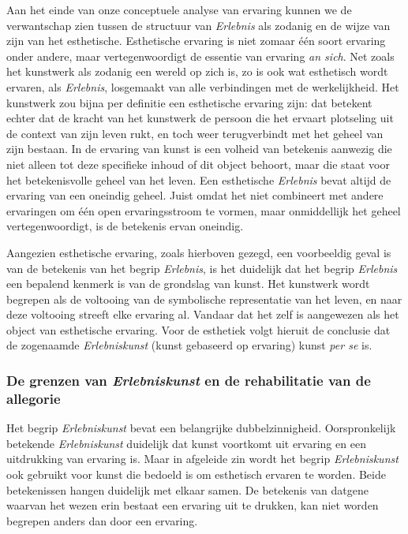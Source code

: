 Aan het einde van onze conceptuele analyse van ervaring kunnen we de verwantschap zien tussen de structuur van \textit{Erlebnis} als zodanig en de wijze van zijn van het esthetische. Esthetische ervaring is niet zomaar één soort ervaring onder andere, maar vertegenwoordigt de essentie van ervaring \textit{an sich}. Net zoals het kunstwerk als zodanig een wereld op zich is, zo is ook wat esthetisch wordt ervaren, als \textit{Erlebnis}, losgemaakt van alle verbindingen met de werkelijkheid. Het kunstwerk zou bijna per definitie een esthetische ervaring zijn: dat betekent echter dat de kracht van het kunstwerk de persoon die het ervaart plotseling uit de context van zijn leven rukt, en toch weer terugverbindt met het geheel van zijn bestaan. In de ervaring van kunst is een volheid van betekenis aanwezig die niet alleen tot deze specifieke inhoud of dit object behoort, maar die staat voor het betekenisvolle geheel van het leven. Een esthetische \textit{Erlebnis} bevat altijd de ervaring van een oneindig geheel. Juist omdat het niet combineert met andere ervaringen om één open ervaringsstroom te vormen, maar onmiddellijk het geheel vertegenwoordigt, is de betekenis ervan oneindig.

Aangezien esthetische ervaring, zoals hierboven gezegd, een voorbeeldig geval is van de betekenis van het begrip \textit{Erlebnis}, is het duidelijk dat het begrip \textit{Erlebnis} een bepalend kenmerk is van de grondslag van kunst. Het kunstwerk wordt begrepen als de voltooing van de symbolische representatie van het leven, en naar deze voltooing streeft elke ervaring al. Vandaar dat het zelf is aangewezen als het object van esthetische ervaring. Voor de esthetiek volgt hieruit de conclusie dat de zogenaamde \textit{Erlebniskunst} (kunst gebaseerd op ervaring) kunst \textit{per se} is.

\subsubsection{De grenzen van \textit{Erlebniskunst} en de rehabilitatie van de allegorie}

Het begrip \textit{Erlebniskunst} bevat een belangrijke dubbelzinnigheid. Oorspronkelijk betekende \textit{Erlebniskunst} duidelijk dat kunst voortkomt uit ervaring en een uitdrukking van ervaring is. Maar in afgeleide zin wordt het begrip \textit{Erlebniskunst} ook gebruikt voor kunst die bedoeld is om esthetisch ervaren te worden. Beide betekenissen hangen duidelijk met elkaar samen. De betekenis van datgene waarvan het wezen erin bestaat een ervaring uit te drukken, kan niet worden begrepen anders dan door een ervaring.


